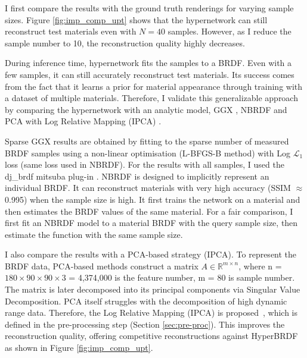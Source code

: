 I first compare the results with the ground truth renderings for varying sample sizes. Figure \ref{fig:imp_comp_upt} shows that the hypernetwork can still reconstruct test materials even with $N = 40$ samples. However, as I reduce the sample number to 10, the reconstruction quality highly decreases. 

During inference time, hypernetwork fits the samples to a \gls{BRDF}. Even with a few samples, it can still accurately reconstruct test materials. Its success comes from the fact that it learns a prior for material appearance through training with a dataset of multiple materials. Therefore, I validate this generalizable approach by comparing the hypernetwork with an analytic model, GGX  \cite{walter2007microfacet}, NBRDF \cite{sztrajman2021neural} and PCA with Log Relative Mapping (IPCA) \cite{nielsen2015optimal}.

Sparse GGX results are obtained by fitting to the sparse number of measured \gls{BRDF} samples using a non-linear optimisation (L-BFGS-B method) with Log $\mathcal{L}_{1}$ loss (same loss used in NBRDF). For the results with all samples, I used the dj\_brdf mitsuba plug-in \cite{dupuy2015photorealistic}. NBRDF \cite{sztrajman2021neural} is designed to implicitly represent an individual \gls{BRDF}. It can reconstruct materials with very high accuracy (\gls{SSIM} $\approx$ 0.995) when the sample size is high. It first trains the network on a material and then estimates the \gls{BRDF} values of the same material. For a fair comparison, I first fit an NBRDF model to a material \gls{BRDF} with the query sample size, then estimate the function with the same sample size. 

I also compare the results with a PCA-based strategy (IPCA). To represent the \gls{BRDF} data, PCA-based methods  \cite{matusik2003data, ngan2006image} construct a matrix ${A} \in \mathbb{R}^{m \times n}$, where n = $180 \times 90 \times 90 \times 3$ = 4,374,000 is the feature number, m = 80 is sample number. The matrix is later decomposed into its principal components via Singular Value Decomposition. PCA itself struggles with the decomposition of high dynamic range data. Therefore, the Log Relative Mapping (IPCA) is proposed~\cite{nielsen2015optimal}, which is defined in the pre-processing step (Section \ref{sec:pre-proc}). This improves the reconstruction quality, offering competitive reconstructions against HyperBRDF as shown in Figure \ref{fig:imp_comp_upt}.

